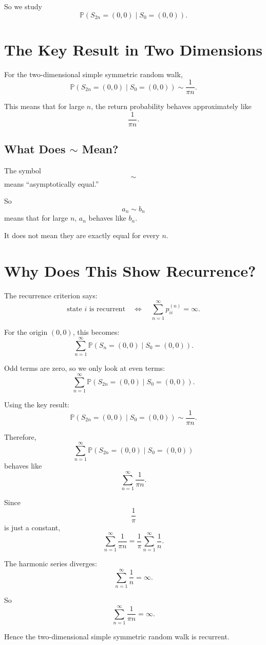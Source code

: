 \documentclass[12pt,a4paper]{article}
\theoremstyle{notestyle}
\newcommand{\Prob}{\mathbb{P}}
\begin{document}
So we study
\[
\Prob(S_{2n}=(0,0)\mid S_0=(0,0)).
\]

\section{The Key Result in Two Dimensions}

For the two-dimensional simple symmetric random walk,
\[
\Prob(S_{2n}=(0,0)\mid S_0=(0,0))
\sim
\frac{1}{\pi n}.
\]

This means that for large $n$, the return probability behaves approximately like
\[
\frac1{\pi n}.
\]

\subsection*{What Does $\sim$ Mean?}

The symbol
\[
\sim
\]
means ``asymptotically equal.''

So
\[
a_n\sim b_n
\]
means that for large $n$, $a_n$ behaves like $b_n$.

It does not mean they are exactly equal for every $n$.

\section{Why Does This Show Recurrence?}

The recurrence criterion says:
\[
\text{state }i\text{ is recurrent}
\quad\Longleftrightarrow\quad
\sum_{n=1}^{\infty}p_{ii}^{(n)}=\infty.
\]

For the origin $(0,0)$, this becomes:
\[
\sum_{n=1}^{\infty}
\Prob(S_n=(0,0)\mid S_0=(0,0)).
\]

Odd terms are zero, so we only look at even terms:
\[
\sum_{n=1}^{\infty}
\Prob(S_{2n}=(0,0)\mid S_0=(0,0)).
\]

Using the key result:
\[
\Prob(S_{2n}=(0,0)\mid S_0=(0,0))
\sim
\frac1{\pi n}.
\]

Therefore,
\[
\sum_{n=1}^{\infty}
\Prob(S_{2n}=(0,0)\mid S_0=(0,0))
\]
behaves like
\[
\sum_{n=1}^{\infty}\frac1{\pi n}.
\]

Since
\[
\frac1{\pi}
\]
is just a constant,
\[
\sum_{n=1}^{\infty}\frac1{\pi n}
=
\frac1{\pi}\sum_{n=1}^{\infty}\frac1n.
\]

The harmonic series diverges:
\[
\sum_{n=1}^{\infty}\frac1n=\infty.
\]

So
\[
\sum_{n=1}^{\infty}\frac1{\pi n}=\infty.
\]

Hence the two-dimensional simple symmetric random walk is recurrent.
\end{document}
